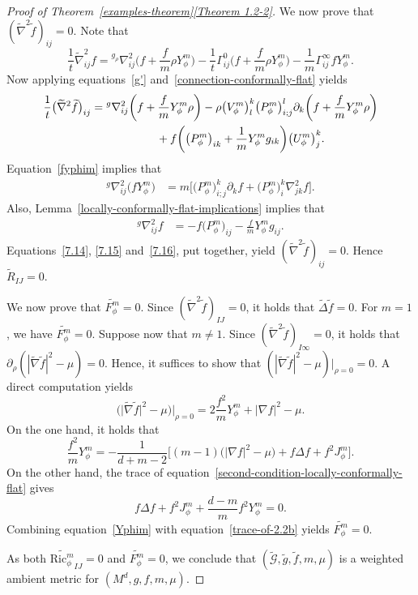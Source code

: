 \documentclass[10pt,a4paper]{amsart}
\numberwithin{equation}{section}
\begin{document}
\begin{proof}[Proof of Theorem~\ref{examples-theorem}\ref{Theorem 1.2-2}]
We now prove that $(\widetilde{\nabla}^2\widetilde{f})_{ij}=0$. Note that
\[
\frac{1}{t}\widetilde{\nabla}_{ij}^2 f={}^{g_\rho}\nabla_{ij}^2\biggl(f+\frac{f}{m}\rho Y_\phi^m\biggr)-\frac{1}{t}\Gamma_{ij}^0\biggl(f+\frac{f}{m}\rho Y_\phi^m\biggr)-\frac{1}{m}\Gamma_{ij}^\infty fY_\phi^m.
\]
Now applying equations~\eqref{g'} and~\eqref{connection-conformally-flat} yields
\begin{gather}
\frac{1}{t}\big(\widetilde{\nabla}^2\widetilde{f}\big)_{ij}= {}^g\nabla^2_{ij}\biggl(f+\frac{f}{m}Y_\phi^m\rho\biggr)
-\rho \big(V_\phi^m\big)_l^k\big(P_\phi^m\big)^l_{i;j}\partial_k\biggl(f+\frac{f}{m}Y_\phi^m\rho\biggr)\nonumber
\\ \hphantom{\frac{1}{t}\big(\widetilde{\nabla}^2\widetilde{f}\big)_{ij}=}
{}+f\biggl(\big(P_\phi^m\big)_{ik}+\frac{1}{m}Y_\phi^m g_{ik}\biggr)\big(U_\phi^m\big)_j^k.\label{7.14}
\end{gather}
Equation~\eqref{fyphim} implies that
\begin{align}
\label{7.15}
{}^g\nabla^2_{ij}\big(fY_\phi^m\big)&=m\big[\big(P_\phi^m\big)^k_{i;j}\partial_k f+\big(P_\phi^m\big)_i^k \nabla^2_{jk}f\big].
\end{align}
Also, Lemma~\ref{locally-conformally-flat-implications} implies that
{\samepage\begin{align}
\label{7.16}
{}^g\nabla^2_{ij}f&=-f\big(P_\phi^m\big)_{ij}-\frac{f}{m}Y_\phi^mg_{ij}.
\end{align}
Equations~\eqref{7.14}, \eqref{7.15} and~\eqref{7.16}, put together, yield $(\widetilde{\nabla}^2\widetilde{f})_{ij}=0$. Hence $\widetilde{R}_{IJ}=0$.}

We now prove that $\widetilde{F_\phi^m}=0$. Since $(\widetilde{\nabla}^2\widetilde{f})_{IJ}=0$, it holds that $\widetilde{\Delta}\widetilde{f}=0$. For $m=1$, we have $\widetilde{F_\phi^m}=0$. Suppose now that $m\neq 1$. Since $(\widetilde{\nabla}^2 \widetilde{f})_{I\infty}=0$, it holds that $\partial_\rho(|\widetilde{\nabla}\widetilde{f}|^2-\mu)=0$. Hence, it suffices to show that ${(|\widetilde{\nabla}\widetilde{f}|^2-\mu)}\big|_{\rho=0}=0$. A direct computation yields
\[
\big(\big|\widetilde{\nabla} \widetilde{f}\big|^{2}-\mu\big)\big|_{\rho=0}=2\frac{f^2}{m}Y_\phi^m+|\nabla f|^2-\mu.
\]
On the one hand, it holds that~\cite[Lemma 3.1]{Case2014s}
\begin{equation}
\label{Yphim}
\frac{f^2}{m} Y_{\phi}^{m}=-\frac{1}{d+m-2}\bigl[(m-1)\big(|\nabla f|^2-\mu\big)+f\Delta f+f^2 J_\phi^m\bigr].
\end{equation}
On the other hand, the trace of equation~\eqref{second-condition-locally-conformally-flat} gives
\begin{equation}
\label{trace-of-2.2b}
f\Delta f+f^2 J_\phi^m+ \frac{d-m}{m}f^2 Y_\phi^m=0.
\end{equation}
Combining equation~\eqref{Yphim} with equation~\eqref{trace-of-2.2b} yields $\widetilde{F_\phi^m}=0$.


As both $\widetilde{\mathrm{Ric}_\phi^m}_{IJ}=0$ and $\widetilde{F_\phi^m}=0$, we conclude that $(\widetilde{\mathcal{G}},\widetilde{g},\widetilde{f},m,\mu)$ is a weighted ambient metric for $(M^d,g,f,m,\mu)$.
\end{proof}
\end{document}

